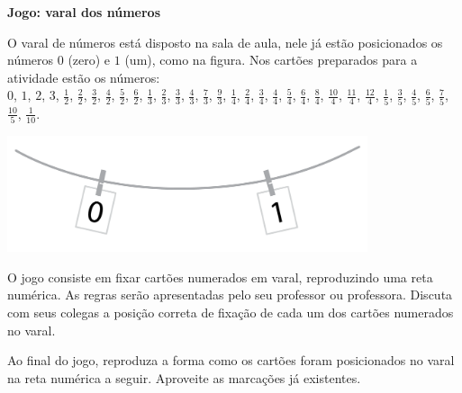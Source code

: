 \begin{atividade}{}

{\bf Jogo: varal dos números}

O varal de números está disposto na sala de aula, nele já estão posicionados os números $0$ (zero) e $1$ (um), como na figura. Nos cartões preparados para a atividade estão os números: \\
$0$, $1$, $2$, $3$, $\frac{1}{2}$, $\frac{2}{2}$, $\frac{3}{2}$, $\frac{4}{2}$, $\frac{5}{2}$, $\frac{6}{2}$,
$\frac{1}{3}$, $\frac{2}{3}$, $\frac{3}{3}$, $\frac{4}{3}$, $\frac{7}{3}$, $\frac{9}{3}$,
$\frac{1}{4}$, $\frac{2}{4}$, $\frac{3}{4}$, $\frac{4}{4}$, $\frac{5}{4}$, $\frac{6}{4}$, $\frac{8}{4}$, $\frac{10}{4}$, $\frac{11}{4}$, $\frac{12}{4}$,
$\frac{1}{5}$, $\frac{3}{5}$, $\frac{4}{5}$, $\frac{6}{5}$, $\frac{7}{5}$, $\frac{10}{5}$,
$\frac{1}{10}$.

\begin{center}
\includegraphics[width=300pt, keepaspectratio]{../figuras/licao03/ativ11_fig01.png}
\end{center}


O jogo consiste em fixar cartões numerados em varal, reproduzindo uma reta numérica. As regras serão apresentadas pelo seu professor ou professora. Discuta com seus colegas a posição correta de fixação de cada um dos cartões numerados no varal.

Ao final do jogo, reproduza a forma como os cartões foram posicionados no varal na reta numérica a seguir. Aproveite as marcações já existentes.

\begin{center}
\end{center}
\end{atividade}

